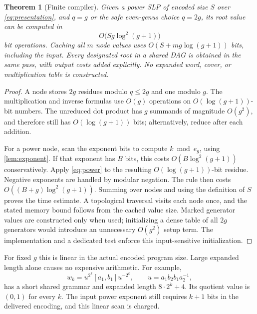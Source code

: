 \documentclass[11pt,letterpaper]{article}
\newtheorem{theorem}{Theorem}[section]
\theoremstyle{definition}
\theoremstyle{remark}
\begin{document}
\begin{theorem}[Finite compiler]\label{thm:compiler}
Given a power SLP of encoded size $S$ over \eqref{eq:presentation}, and $q=g$ or the safe even-genus choice $q=2g$, its root value can be computed in
\[
 O\bigl(Sg\log^2(g+1)\bigr)
\]
bit operations. Caching all $m$ node values uses
$O(S+mg\log(g+1))$ bits, including the input. Every designated root in a shared DAG is obtained in the same pass, with output costs added explicitly. No expanded word, cover, or multiplication table is constructed.
\end{theorem}
\begin{proof}
A node stores $2g$ residues modulo $q\le2g$ and one modulo $g$. The multiplication and inverse formulas use $O(g)$ operations on $O(\log(g+1))$-bit numbers. The unreduced dot product has $g$ summands of magnitude $O(g^2)$, and therefore still has $O(\log(g+1))$ bits; alternatively, reduce after each addition.

For a power node, scan the exponent bits to compute $k\bmod e_g$, using \cref{lem:exponent}. If that exponent has $B$ bits, this costs $O(B\log^2(g+1))$ conservatively. Apply \eqref{eq:power} to the resulting $O(\log(g+1))$-bit residue. Negative exponents are handled by modular negation. The rule then costs $O((B+g)\log^2(g+1))$. Summing over nodes and using the definition of $S$ proves the time estimate. A topological traversal visits each node once, and the stated memory bound follows from the cached value size. Marked generator values are constructed only when used; initializing a dense table of all $2g$ generators would introduce an unnecessary $O(g^2)$ setup term. The implementation and a dedicated test enforce this input-sensitive initialization.
\end{proof}

For fixed $g$ this is linear in the actual encoded program size. Large expanded length alone causes no expensive arithmetic. For example,
\begin{equation}\label{eq:benchmarkfamily}
 w_k=u^{2^k}[a_1,b_1]u^{-2^k},\qquad
 u=a_1b_2b_1a_2^{-1},
\end{equation}
has a short shared grammar and expanded length $8\cdot2^k+4$. Its quotient value is $(0,1)$ for every $k$. The input power exponent still requires $k+1$ bits in the delivered encoding, and this linear scan is charged.
\end{document}
